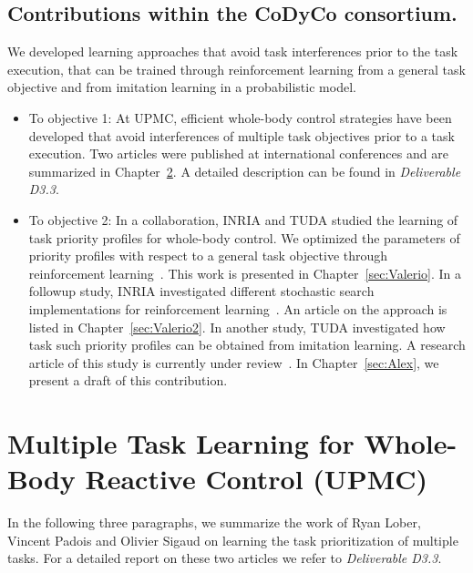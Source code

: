 \documentclass[12pt,a4paper,twoside]{report}
\begin{document}
\section{Contributions within the CoDyCo consortium.} We developed learning approaches that avoid task interferences prior to the task execution,  
that can be trained through reinforcement learning from a general task objective and from imitation learning in a probabilistic model. 
\begin{itemize}
 \item To objective 1: At UPMC, efficient whole-body control strategies have been developed that 
avoid interferences of multiple task objectives prior to a task execution. Two articles were published at international conferences and 
are summarized in Chapter~\ref{sec:Ryan}. A detailed description can be found in \textit{Deliverable D3.3}. 
\item To objective 2: In a collaboration, INRIA and TUDA studied the learning of task priority profiles for whole-body control. We optimized the parameters of priority profiles with respect to a general task objective through reinforcement learning~\cite{Modugno_PICRA_2016}. This work is presented in Chapter~\ref{sec:Valerio}.
\newline In a followup study, INRIA investigated different stochastic search implementations for reinforcement learning~\cite{modugno2016learning}. An article on the approach is listed in 
Chapter~\ref{sec:Valerio2}. 
\newline In another study, TUDA investigated how task such priority profiles can be obtained from imitation learning. 
A research article of this study is currently under review~\cite{Paraschos_2017}. In Chapter~\ref{sec:Alex}, we present a draft of this contribution. 
\end{itemize}


\chapter{Multiple Task Learning for Whole-Body Reactive Control (UPMC)}\label{sec:Ryan}

In the following three paragraphs, we summarize the work of Ryan Lober, Vincent Padois and Olivier Sigaud on 
learning the task prioritization of multiple tasks. For a detailed report on these two articles we refer to 
\textit{Deliverable D3.3}.
\end{document}
